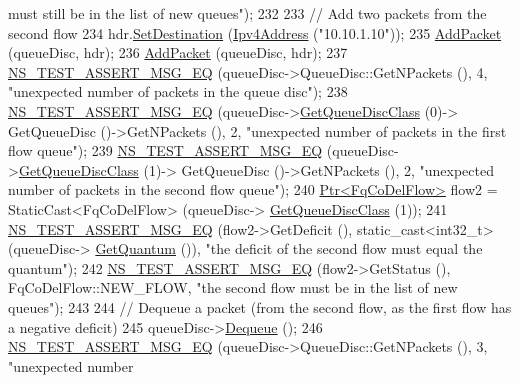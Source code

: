 \begin{DoxyCode}
{       must still be in the list of new queues"});
232 
233   \textcolor{comment}{// Add two packets from the second flow}
234   hdr.\hyperlink{classns3_1_1Ipv4Header_a154e584fb5418de7a5ce34dbb852de02}{SetDestination} (\hyperlink{classns3_1_1Ipv4Address}{Ipv4Address} (\textcolor{stringliteral}{"10.10.1.10"}));
235   \hyperlink{classFqCoDelQueueDiscDeficit_a366b7108078d16452276b4be0b679ac9}{AddPacket} (queueDisc, hdr);
236   \hyperlink{classFqCoDelQueueDiscDeficit_a366b7108078d16452276b4be0b679ac9}{AddPacket} (queueDisc, hdr);
237   \hyperlink{group__testing_ga2a9d78cffb3db8e867c35fff0b698cf5}{NS\_TEST\_ASSERT\_MSG\_EQ} (queueDisc->QueueDisc::GetNPackets (), 4, \textcolor{stringliteral}{"unexpected number
       of packets in the queue disc"});
238   \hyperlink{group__testing_ga2a9d78cffb3db8e867c35fff0b698cf5}{NS\_TEST\_ASSERT\_MSG\_EQ} (queueDisc->\hyperlink{classns3_1_1QueueDisc_a584d228f7bff3f754d32793a38134556}{GetQueueDiscClass} (0)->
      GetQueueDisc ()->GetNPackets (), 2, \textcolor{stringliteral}{"unexpected number of packets in the first flow queue"});
239   \hyperlink{group__testing_ga2a9d78cffb3db8e867c35fff0b698cf5}{NS\_TEST\_ASSERT\_MSG\_EQ} (queueDisc->\hyperlink{classns3_1_1QueueDisc_a584d228f7bff3f754d32793a38134556}{GetQueueDiscClass} (1)->
      GetQueueDisc ()->GetNPackets (), 2, \textcolor{stringliteral}{"unexpected number of packets in the second flow queue"});
240   \hyperlink{classns3_1_1Ptr}{Ptr<FqCoDelFlow>} flow2 = StaticCast<FqCoDelFlow> (queueDisc->
      \hyperlink{classns3_1_1QueueDisc_a584d228f7bff3f754d32793a38134556}{GetQueueDiscClass} (1));
241   \hyperlink{group__testing_ga2a9d78cffb3db8e867c35fff0b698cf5}{NS\_TEST\_ASSERT\_MSG\_EQ} (flow2->GetDeficit (), \textcolor{keyword}{static\_cast<}int32\_t\textcolor{keyword}{>} (queueDisc->
      \hyperlink{classns3_1_1FqCoDelQueueDisc_aa3825612fcd4bec24bd0d52e97bd89b5}{GetQuantum} ()), \textcolor{stringliteral}{"the deficit of the second flow must equal the quantum"});
242   \hyperlink{group__testing_ga2a9d78cffb3db8e867c35fff0b698cf5}{NS\_TEST\_ASSERT\_MSG\_EQ} (flow2->GetStatus (), FqCoDelFlow::NEW\_FLOW, \textcolor{stringliteral}{"the second flow
       must be in the list of new queues"});
243 
244   \textcolor{comment}{// Dequeue a packet (from the second flow, as the first flow has a negative deficit)}
245   queueDisc->\hyperlink{classns3_1_1QueueDisc_a6c13fc489822c1487f61c2289f2e3629}{Dequeue} ();
246   \hyperlink{group__testing_ga2a9d78cffb3db8e867c35fff0b698cf5}{NS\_TEST\_ASSERT\_MSG\_EQ} (queueDisc->QueueDisc::GetNPackets (), 3, \textcolor{stringliteral}{"unexpected number
}
\end{DoxyCode}
